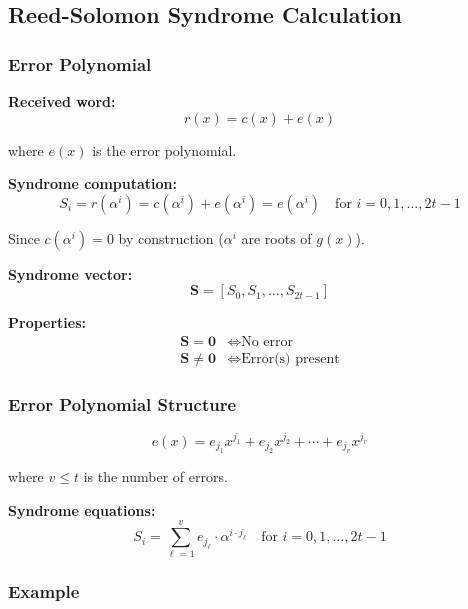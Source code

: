 \documentclass[11pt,a4paper]{article}
\begin{document}
\subsection{Reed-Solomon Syndrome Calculation}

\subsubsection{Error Polynomial}

\textbf{Received word:}
\begin{equation}
r(x) = c(x) + e(x)
\end{equation}

where $e(x)$ is the error polynomial.

\textbf{Syndrome computation:}
\begin{equation}
S_i = r(\alpha^i) = c(\alpha^i) + e(\alpha^i) = e(\alpha^i) \quad \text{for } i = 0, 1, \ldots, 2t-1
\end{equation}

Since $c(\alpha^i) = 0$ by construction ($\alpha^i$ are roots of $g(x)$).

\textbf{Syndrome vector:}
\begin{equation}
\mathbf{S} = [S_0, S_1, \ldots, S_{2t-1}]
\end{equation}

\textbf{Properties:}
\begin{align}
\mathbf{S} = \mathbf{0} &\iff \text{No error} \\
\mathbf{S} \neq \mathbf{0} &\iff \text{Error(s) present}
\end{align}

\subsubsection{Error Polynomial Structure}

\begin{equation}
e(x) = e_{j_1} x^{j_1} + e_{j_2} x^{j_2} + \cdots + e_{j_v} x^{j_v}
\end{equation}

where $v \leq t$ is the number of errors.

\textbf{Syndrome equations:}
\begin{equation}
S_i = \sum_{\ell=1}^v e_{j_\ell} \cdot \alpha^{i \cdot j_\ell} \quad \text{for } i = 0, 1, \ldots, 2t-1
\end{equation}

\subsubsection{Example}
\end{document}
